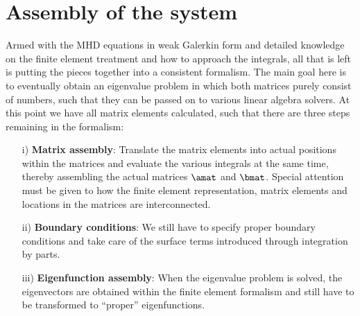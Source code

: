 \section{Assembly of the system}
Armed with the MHD equations in weak Galerkin form and detailed knowledge on the finite element treatment and how to approach the integrals, all that is left is putting the pieces together into a consistent formalism. The main goal here is to eventually obtain an eigenvalue problem in which both matrices purely consist of numbers, such that they can be passed on to various linear algebra solvers. At this point we have all matrix elements calculated, such that there are three steps remaining in the formalism:
\begin{itemize}
  \item[i)] \textbf{Matrix assembly}: Translate the matrix elements into actual positions within the matrices and evaluate the various integrals at the same time, thereby assembling the actual matrices $\amat$ and $\bmat$. Special attention must be given to how the finite element representation, matrix elements and locations in the matrices are interconnected.
  \item[ii)] \textbf{Boundary conditions}: We still have to specify proper boundary conditions and take care of the surface terms introduced through integration by parts.
  \item[iii)] \textbf{Eigenfunction assembly}: When the eigenvalue problem is solved, the eigenvectors are obtained within the finite element formalism and still have to be transformed to ``proper'' eigenfunctions.
\end{itemize}

